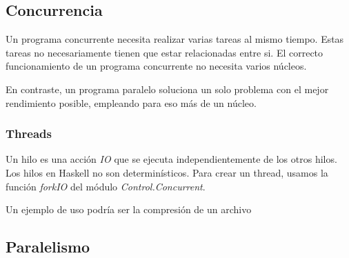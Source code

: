 

\subsection{Concurrencia} %
\label{sub:concurrencia}


Un programa concurrente necesita realizar varias tareas al mismo tiempo. Estas
tareas no necesariamente tienen que estar relacionadas entre si. El correcto
funcionamiento de un programa concurrente no necesita varios núcleos.

En contraste, un programa paralelo soluciona un solo problema con el mejor
rendimiento posible, empleando para eso más de un núcleo.

\subsubsection{Threads} %
\label{ssub:threads}

Un hilo es una acción \textit{IO} que se ejecuta independientemente
de los otros hilos. Los hilos en Haskell no son determinísticos.
Para crear un thread, usamos la función \textit{forkIO} del módulo
\textit{Control.Concurrent}.

Un ejemplo de uso podría ser la compresión de un archivo




\subsection{Paralelismo} %
\label{sub:paralelismo}



